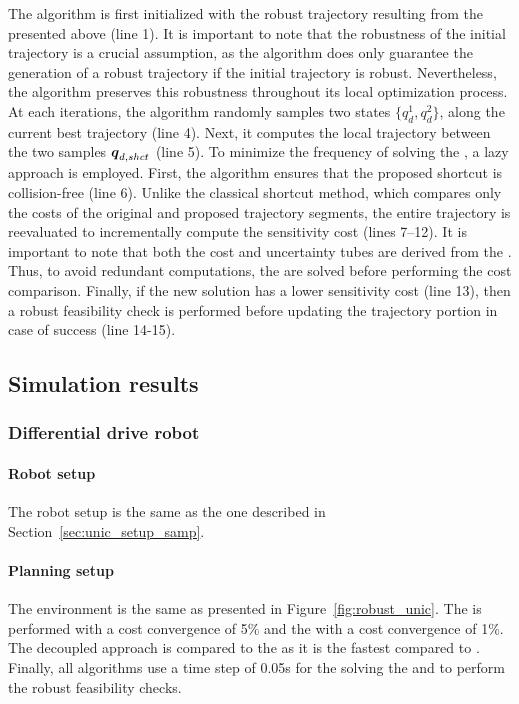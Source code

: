 The algorithm is first initialized with the robust trajectory resulting from the  presented above (line 1).
It is important to note that the robustness of the initial trajectory is a crucial assumption, as the  algorithm does only guarantee the generation of a robust trajectory if the initial trajectory is robust.
Nevertheless, the algorithm preserves this robustness throughout its local optimization process.
At each iterations, the algorithm randomly samples two states $\{q_d^{1}, q_d^{2}\}$, along the current best trajectory (line 4).
Next, it computes the local trajectory between the two samples $\boldsymbol{q}_{d,shct}$ (line 5).
To minimize the frequency of solving the , a lazy approach is employed.
First, the algorithm ensures that the proposed shortcut is collision-free (line 6). 
Unlike the classical shortcut method, which compares only the costs of the original and proposed trajectory segments, the entire trajectory is reevaluated to incrementally compute the sensitivity cost (lines 7–12).
It is important to note that both the cost and uncertainty tubes are derived from the . 
Thus, to avoid redundant computations, the  are solved before performing the cost comparison.
Finally, if the new solution has a lower sensitivity cost (line 13), then a robust feasibility check is performed before updating the trajectory portion in case of success (line 14-15).

\subsection{Simulation results}
\subsubsection{Differential drive robot}

\paragraph{Robot setup}

The robot setup is the same as the one described in Section~\ref{sec:unic_setup_samp}.

\paragraph{Planning setup}

The environment is the same as presented in Figure~\ref{fig:robust_unic}.
The  is performed with a cost convergence of 5\% and the  with a cost convergence of 1\%.
The decoupled approach is compared to the  as it is the fastest compared to .
Finally, all algorithms use a time step of 0.05s for the solving the  and to perform the robust feasibility checks.

